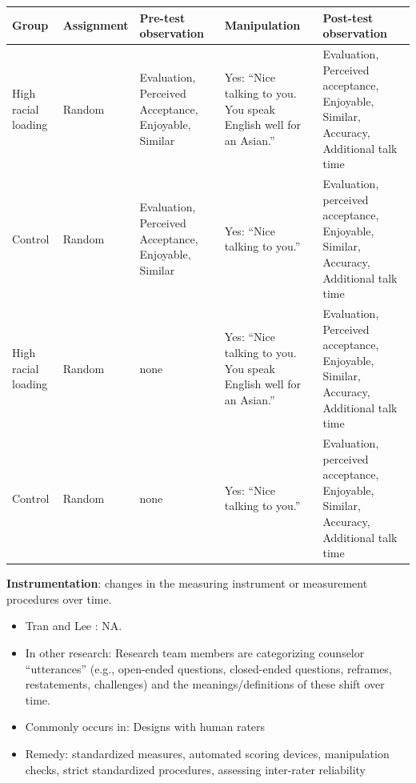 \documentclass[
  english,
]{book}
\providecommand{\tightlist}{%
  \setlength{\itemsep}{0pt}\setlength{\parskip}{0pt}}
\begin{document}
\begin{longtable}[]{@{}
  >{\raggedright\arraybackslash}p{}
  >{\raggedright\arraybackslash}p{}
  >{\raggedright\arraybackslash}p{}
  >{\raggedright\arraybackslash}p{}
  >{\raggedright\arraybackslash}p{}@{}}
\toprule
Group & Assignment & Pre-test observation & Manipulation & Post-test observation \\
\midrule
\endhead
High racial loading & Random & Evaluation, Perceived Acceptance, Enjoyable, Similar & Yes: ``Nice talking to you. You speak English well for an Asian.'' & Evaluation, Perceived acceptance, Enjoyable, Similar, Accuracy, Additional talk time \\
Control & Random & Evaluation, Perceived Acceptance, Enjoyable, Similar & Yes: ``Nice talking to you.'' & Evaluation, perceived acceptance, Enjoyable, Similar, Accuracy, Additional talk time \\
High racial loading & Random & none & Yes: ``Nice talking to you. You speak English well for an Asian.'' & Evaluation, Perceived acceptance, Enjoyable, Similar, Accuracy, Additional talk time \\
Control & Random & none & Yes: ``Nice talking to you.'' & Evaluation, perceived acceptance, Enjoyable, Similar, Accuracy, Additional talk time \\
\bottomrule
\end{longtable}

\textbf{Instrumentation}: changes in the measuring instrument or measurement procedures over time.

\begin{itemize}
\tightlist
\item
  Tran and Lee \citeyearpar{tran_you_2014}: NA.
\item
  In other research: Research team members are categorizing counselor ``utterances'' (e.g., open-ended questions, closed-ended questions, reframes, restatements, challenges) and the meanings/definitions of these shift over time.
\item
  Commonly occurs in: Designs with human raters
\item
  Remedy: standardized measures, automated scoring devices, manipulation checks, strict standardized procedures, assessing inter-rater reliability
\end{itemize}
\end{document}
